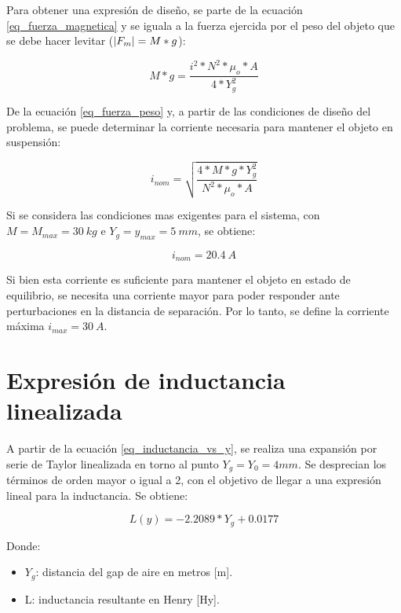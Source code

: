\noindent Para obtener una expresión de diseño, se parte de la ecuación \ref{eq_fuerza_magnetica} y se iguala a la fuerza ejercida por el peso del objeto que se debe hacer levitar ($\lvert F_{m}\rvert=M*g$):

\begin{equation}\label{eq_fuerza_peso}
	M*g=\frac{i^{2}*N^{2}*\mu_{o}*A}{4*Y_{g}^{2}}
\end{equation}

\noindent De la ecuación \ref{eq_fuerza_peso} y, a partir de las condiciones de diseño del problema, se puede determinar la corriente necesaria para mantener el objeto en suspensión:

\begin{equation} \label{eq_corriente_peso}
	i_{nom}=\sqrt{\frac{4*M*g*Y_{g}^{2}}{N^{2}*\mu_{o}*A}}
\end{equation}

Si se considera las condiciones mas exigentes para el sistema, con $M=M_{max}=30\:kg$ e $Y_{g}=y_{max}=5\:mm$, se obtiene:

\begin{equation}
	i_{nom}=20.4\:A
\end{equation}

\noindent Si bien esta corriente es suficiente para mantener el objeto en estado de equilibrio, se necesita una corriente mayor para poder responder ante perturbaciones en la distancia de separación. Por lo tanto, se define la corriente máxima $i_{max}=30\:A$.



\section{Expresión de inductancia linealizada}
\label{secc_exp_ind_linealizada}

\noindent A partir de la ecuación \ref{eq_inductancia_vs_y}, se realiza una expansión por serie de Taylor linealizada en torno al punto $Y_{g}=Y_{0}=4mm$. Se desprecian los términos de orden mayor o igual a 2, con el objetivo de llegar a una expresión lineal para la inductancia. Se obtiene:


\begin{equation} \label{eq_inductancia_lineal_teorica}
	L(y)=-2.2089*Y_{g}+0.0177
\end{equation}

\noindent Donde:
\begin{itemize}
	\item $Y_{g}$: distancia del gap de aire en metros [m].
	\item L: inductancia resultante en Henry [Hy].
\end{itemize}

